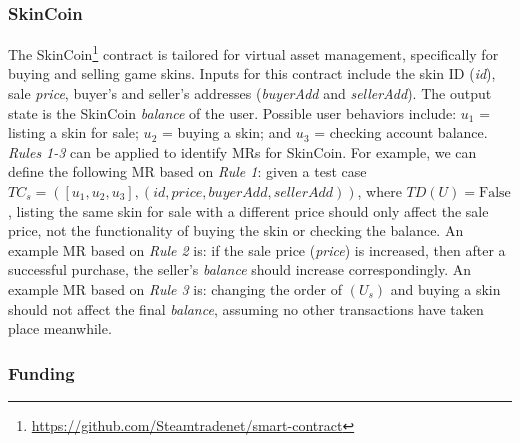 \subsubsection{SkinCoin}

The SkinCoin\footnote{\url{https://github.com/Steamtradenet/smart-contract}} contract is tailored for virtual asset management, specifically for buying and selling game skins. Inputs for this contract include the skin ID (\textit{id}), sale \textit{price}, buyer's and seller's addresses (\textit{buyerAdd} and \textit{sellerAdd}). The output state is the SkinCoin \textit{balance} of the user. Possible user behaviors include: \(u_1\) = listing a skin for sale; \(u_2\) = buying a skin; and \(u_3\) = checking account balance. \textit{Rules 1-3} can be applied to identify MRs for SkinCoin. For example, we can define the following MR based on \textit{Rule 1}: given a test case \(TC_s = ([u_1,u_2,u_3],(id, price, buyerAdd, sellerAdd))\), where \(TD(U) = \text{False}\), listing the same skin for sale with a different price should only affect the sale price, not the functionality of buying the skin or checking the balance. An example MR based on \textit{Rule 2} is: if the sale price (\textit{price}) is increased, then after a successful purchase, the seller's \textit{balance} should increase correspondingly. An example MR based on \textit{Rule 3} is: changing the order of \((U_s)\) and buying a skin should not affect the final \textit{balance}, assuming no other transactions have taken place meanwhile.

\subsubsection{Funding}

